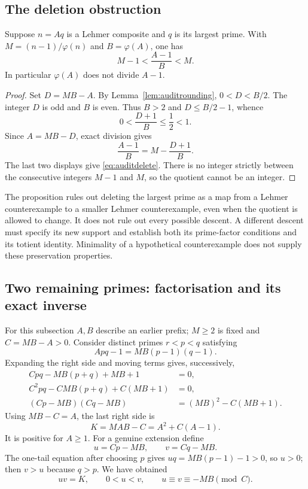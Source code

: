 \subsection{The deletion obstruction}
\begin{proposition}
\label{prop:auditdeletion}
Suppose $n=Aq$ is a Lehmer composite and $q$ is its largest prime.
With $M=(n-1)/\varphi(n)$ and $B=\varphi(A)$, one has
\begin{equation}\label{eq:auditdelete}
 M-1<\frac{A-1}{B}<M.
\end{equation}
In particular $\varphi(A)$ does not divide $A-1$.
\end{proposition}
\begin{proof}
Set $D=MB-A$. By Lemma~\ref{lem:auditrounding}, $0<D<B/2$.
The integer $D$ is odd and $B$ is even. Thus $B>2$ and
$D\le B/2-1$, whence
\[
 0<\frac{D+1}{B}\le\frac12<1.
\]
Since $A=MB-D$, exact division gives
\[
 \frac{A-1}{B}=M-\frac{D+1}{B}.
\]
The last two displays give \eqref{eq:auditdelete}. There is no
integer strictly between the consecutive integers $M-1$ and $M$,
so the quotient cannot be an integer.
\end{proof}

The proposition rules out deleting the largest prime as a map from a
Lehmer counterexample to a smaller Lehmer counterexample, even when
the quotient is allowed to change. It does not rule out every possible
descent. A different descent must specify its new support and establish
both its prime-factor conditions and its totient identity. Minimality
of a hypothetical counterexample does not supply these preservation
properties.

\subsection{Two remaining primes: factorisation and its exact inverse}
For this subsection $A,B$ describe an earlier prefix; $M\ge2$ is
fixed and $C=MB-A>0$. Consider distinct primes $r<p<q$ satisfying
\begin{equation}\label{eq:audittwotarget}
 Apq-1=MB(p-1)(q-1).
\end{equation}
Expanding the right side and moving terms gives, successively,
\begin{align*}
 Cpq-MB(p+q)+MB+1&=0,\\
 C^2pq-CMB(p+q)+C(MB+1)&=0,\\
 (Cp-MB)(Cq-MB)&=(MB)^2-C(MB+1).
\end{align*}
Using $MB-C=A$, the last right side is
\begin{equation}\label{eq:auditK}
 K=MAB-C=A^2+C(A-1).
\end{equation}
It is positive for $A\ge1$. For a genuine extension define
\begin{equation}\label{eq:audituv}
 u=Cp-MB,\qquad v=Cq-MB.
\end{equation}
The one-tail equation after choosing $p$ gives
$uq=MB(p-1)-1>0$, so $u>0$; then $v>u$ because $q>p$.
We have obtained
\begin{equation}\label{eq:auditfactorpair}
 uv=K,\qquad 0<u<v,\qquad u\equiv v\equiv-MB\pmod C.
\end{equation}

